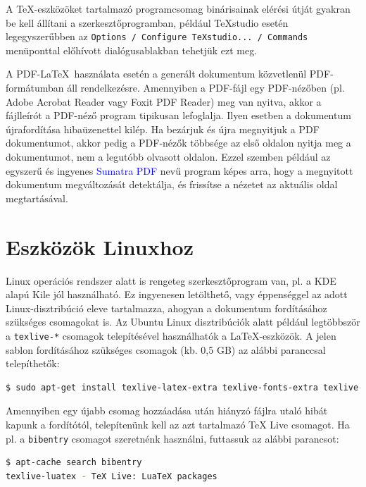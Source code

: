 A \TeX-eszközöket tartalmazó programcsomag binárisainak elérési útját gyakran be kell állítani a szerkesztőprogramban, például TeXstudio esetén legegyszerűbben az \verb+Options / Configure TeXstudio... / Commands+ menüponttal előhívott dialógusablakban tehetjük ezt meg.

A PDF-\LaTeX~használata esetén a generált dokumentum közvetlenül PDF-formátumban áll rendelkezésre. Amennyiben a PDF-fájl egy PDF-nézőben (pl. Adobe Acrobat Reader vagy Foxit PDF Reader) meg van nyitva, akkor a fájlleírót a PDF-néző program tipikusan lefoglalja. Ilyen esetben a dokumentum újrafordítása hibaüzenettel kilép. Ha bezárjuk és újra megnyitjuk a PDF dokumentumot, akkor pedig a PDF-nézők többsége az első oldalon nyitja meg a dokumentumot, nem a legutóbb olvasott oldalon. Ezzel szemben például az egyszerű és ingyenes \textcolor{blue}{Sumatra PDF} nevű program képes arra, hogy a megnyitott dokumentum megváltozását detektálja, és frissítse a nézetet az aktuális oldal megtartásával.

\section{Eszközök Linuxhoz}
Linux operációs rendszer alatt is rengeteg szerkesztőprogram van, pl. a KDE alapú Kile jól használható. Ez ingyenesen letölthető, vagy éppenséggel az adott Linux-disztribúció eleve tartalmazza, ahogyan a dokumentum fordításához szükséges csomagokat is. Az Ubuntu Linux disztribúciók alatt például legtöbbször a \verb+texlive-*+ csomagok telepítésével használhatók a \LaTeX-eszközök. A jelen sablon fordításához szükséges csomagok (kb. 0,5 GB) az alábbi paranccsal telepíthetők:

\begin{lstlisting}[language=bash,morekeywords={sudo,apt\-get},alsoletter={-},breaklines=true]
$ sudo apt-get install texlive-latex-extra texlive-fonts-extra texlive-fonts-recommended texlive-xetex texlive-science
\end{lstlisting}

Amennyiben egy újabb csomag hozzáadása után hiányzó fájlra utaló hibát kapunk a fordítótól, telepítenünk kell az azt tartalmazó TeX Live csomagot. Ha pl. a \verb+bibentry+ csomagot szeretnénk használni, futtassuk az alábbi parancsot:

\begin{lstlisting}[language=bash,morekeywords={apt\-cache},alsoletter={-},breaklines=true]
$ apt-cache search bibentry
texlive-luatex - TeX Live: LuaTeX packages
\end{lstlisting}

